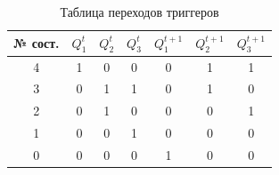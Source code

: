 \documentclass[14pt, a4paper]{extarticle}
\begin{document}
\begin{table}[h!]
	\centering
	\begin{tabular}{|c|c|c|c|c|c|c|}
		\hline
		№ сост. & $Q_1^t$ & $Q_2^t$ & $Q_3^t$ & $Q_1^{t+1}$ & $Q_2^{t+1}$ & $Q_3^{t+1}$ \\ \hline
		4 &	1 & 0 & 0 & 0 & 1 & 1 \\ \hline
		3 &	0 & 1 & 1 & 0 & 1 & 0 \\ \hline
		2 &	0 & 1 & 0 & 0 & 0 & 1 \\ \hline
		1 &	0 & 0 & 1 & 0 & 0 & 0 \\ \hline
		0 &	0 & 0 & 0 & 1 & 0 & 0 \\ \hline
	\end{tabular}
	\caption{Таблица переходов триггеров}
	\label{tab:1}
\end{table}
\end{document}

